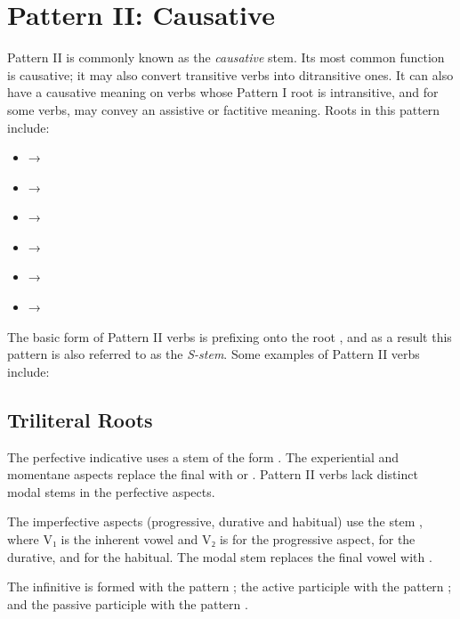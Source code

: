 \documentclass[grammar]{subfiles}
\begin{document}
\clearpage
\section{Pattern II: Causative}
\label{sec:vm:pattern_ii}

Pattern II is commonly known as the \emph{causative} stem.  Its most common
function is causative; it may also convert transitive verbs into ditransitive
ones.  It can also have a causative meaning on verbs whose Pattern I root is
intransitive, and for some verbs, may convey an assistive or factitive meaning.
Roots in this pattern include: 

\begin{itemize}
  \item {} → 
  \item {} → 
  \item {} → 
  \item {} → 
  \item {} → 
  \item {} → 
\end{itemize}


The basic form of Pattern II verbs is prefixing  onto the root
, and as a result this pattern is also referred to as the
\emph{S-stem}.  Some examples of Pattern II verbs include:

\subsection{Triliteral Roots}
\label{ssec:vm:ii_triliteral}

The perfective indicative uses a stem of the form . The
experiential and momentane aspects replace the final  with  or
.  Pattern II verbs lack distinct modal stems in the perfective aspects.  

The imperfective aspects (progressive, durative and  habitual) use the stem
, where V₁ is the inherent vowel and V₂ is  for the
progressive aspect,  for the durative, and  for the habitual.
The modal stem replaces the final vowel with . 

The infinitive is formed with the pattern ; the active participle
with the pattern ; and the passive participle with the pattern
.
\end{document}
